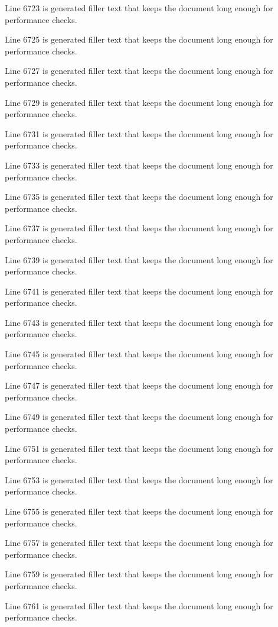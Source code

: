 Line 6723 is generated filler text that keeps the document long enough for performance checks.

Line 6725 is generated filler text that keeps the document long enough for performance checks.

Line 6727 is generated filler text that keeps the document long enough for performance checks.

Line 6729 is generated filler text that keeps the document long enough for performance checks.

Line 6731 is generated filler text that keeps the document long enough for performance checks.

Line 6733 is generated filler text that keeps the document long enough for performance checks.

Line 6735 is generated filler text that keeps the document long enough for performance checks.

Line 6737 is generated filler text that keeps the document long enough for performance checks.

Line 6739 is generated filler text that keeps the document long enough for performance checks.

Line 6741 is generated filler text that keeps the document long enough for performance checks.

Line 6743 is generated filler text that keeps the document long enough for performance checks.

Line 6745 is generated filler text that keeps the document long enough for performance checks.

Line 6747 is generated filler text that keeps the document long enough for performance checks.

Line 6749 is generated filler text that keeps the document long enough for performance checks.

Line 6751 is generated filler text that keeps the document long enough for performance checks.

Line 6753 is generated filler text that keeps the document long enough for performance checks.

Line 6755 is generated filler text that keeps the document long enough for performance checks.

Line 6757 is generated filler text that keeps the document long enough for performance checks.

Line 6759 is generated filler text that keeps the document long enough for performance checks.

Line 6761 is generated filler text that keeps the document long enough for performance checks.

